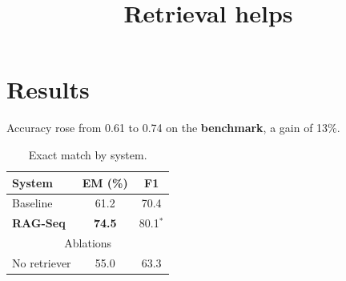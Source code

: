\documentclass{article}
\begin{document}
\title{Retrieval helps}
\section{Results}
Accuracy rose from 0.61 to 0.74 \cite{lewis} on the \textbf{benchmark}, a gain of 13\%.
\begin{table}[t]
\caption{Exact match by system.}
\begin{tabular}{lcc}
\toprule
System & EM (\%) & F1 \\
\midrule
Baseline & 61.2 & 70.4 \\
\textbf{RAG-Seq} & \textbf{74.5} & 80.1$^{*}$ \\
\multicolumn{3}{c}{Ablations} \\
No retriever & 55.0 & 63.3 \\
\bottomrule
\end{tabular}
\end{table}

\end{document}
